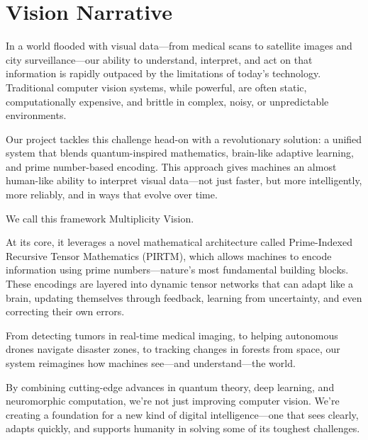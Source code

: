 \documentclass{article}
\theoremstyle{plain}
\begin{document}
\section*{Vision Narrative}

In a world flooded with visual data—from medical scans to satellite images and city surveillance—our ability to understand, interpret, and act on that information is rapidly outpaced by the limitations of today’s technology. Traditional computer vision systems, while powerful, are often static, computationally expensive, and brittle in complex, noisy, or unpredictable environments.

Our project tackles this challenge head-on with a revolutionary solution: a unified system that blends quantum-inspired mathematics, brain-like adaptive learning, and prime number-based encoding. This approach gives machines an almost human-like ability to interpret visual data—not just faster, but more intelligently, more reliably, and in ways that evolve over time.

We call this framework Multiplicity Vision.

At its core, it leverages a novel mathematical architecture called Prime-Indexed Recursive Tensor Mathematics (PIRTM), which allows machines to encode information using prime numbers—nature’s most fundamental building blocks. These encodings are layered into dynamic tensor networks that can adapt like a brain, updating themselves through feedback, learning from uncertainty, and even correcting their own errors.

From detecting tumors in real-time medical imaging, to helping autonomous drones navigate disaster zones, to tracking changes in forests from space, our system reimagines how machines see—and understand—the world.

By combining cutting-edge advances in quantum theory, deep learning, and neuromorphic computation, we’re not just improving computer vision. We’re creating a foundation for a new kind of digital intelligence—one that sees clearly, adapts quickly, and supports humanity in solving some of its toughest challenges.
\end{document}
